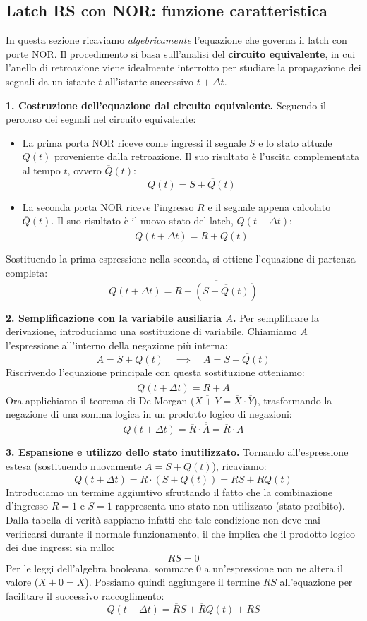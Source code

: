 \documentclass[11pt,a4paper]{report}
\begin{document}
\subsection{Latch RS con NOR: funzione caratteristica}

\noindent In questa sezione ricaviamo \emph{algebricamente} l'equazione che governa il latch con porte NOR.
Il procedimento si basa sull'analisi del \textbf{circuito equivalente}, in cui l'anello di retroazione viene idealmente interrotto per studiare la propagazione dei segnali da un istante $t$ all'istante successivo $t+\Delta t$.

\medskip
\noindent\textbf{1. Costruzione dell'equazione dal circuito equivalente.}
Seguendo il percorso dei segnali nel circuito equivalente:
\begin{itemize}[leftmargin=1.5em]
    \item La prima porta NOR riceve come ingressi il segnale $S$ e lo stato attuale $Q(t)$ proveniente dalla retroazione. Il suo risultato è l'uscita complementata al tempo $t$, ovvero $\overline{Q}(t)$:
    \[ \overline{Q}(t) = \overline{S + Q(t)} \]
    \item La seconda porta NOR riceve l'ingresso $R$ e il segnale appena calcolato $\overline{Q}(t)$. Il suo risultato è il nuovo stato del latch, $Q(t+\Delta t)$:
    \[ Q(t+\Delta t) = \overline{ R + \overline{Q}(t) } \]
\end{itemize}
Sostituendo la prima espressione nella seconda, si ottiene l'equazione di partenza completa:
\[
Q(t+\Delta t) = \overline{ R + (\overline{S + Q(t)}) }
\]

\medskip
\noindent\textbf{2. Semplificazione con la variabile ausiliaria $A$.}
Per semplificare la derivazione, introduciamo una sostituzione di variabile. Chiamiamo $A$ l'espressione all'interno della negazione più interna:
\[
A = S + Q(t) \quad \implies \quad \overline{A} = \overline{S + Q(t)}
\]
Riscrivendo l'equazione principale con questa sostituzione otteniamo:
\[
Q(t+\Delta t) = \overline{ R + \overline{A} }
\]
Ora applichiamo il teorema di De Morgan ($\overline{X + Y} = \overline{X} \cdot \overline{Y}$), trasformando la negazione di una somma logica in un prodotto logico di negazioni:
\[
Q(t+\Delta t) = \overline{R} \cdot \overline{\overline{A}} = \overline{R} \cdot A
\]

\medskip
\noindent\textbf{3. Espansione e utilizzo dello stato inutilizzato.}
Tornando all'espressione estesa (sostituendo nuovamente $A = S + Q(t)$), ricaviamo:
\[
Q(t+\Delta t) = \overline{R} \cdot (S + Q(t)) = \overline{R}S + \overline{R}Q(t)
\]
Introduciamo un termine aggiuntivo sfruttando il fatto che la combinazione d'ingresso $R=1$ e $S=1$ rappresenta uno stato non utilizzato (stato proibito).
Dalla tabella di verità sappiamo infatti che tale condizione non deve mai verificarsi durante il normale funzionamento, il che implica che il prodotto logico dei due ingressi sia nullo:
\[
RS = 0
\]
Per le leggi dell'algebra booleana, sommare $0$ a un'espressione non ne altera il valore ($X+0=X$). Possiamo quindi aggiungere il termine $RS$ all'equazione per facilitare il successivo raccoglimento:
\[
Q(t+\Delta t) = \overline{R}S + \overline{R}Q(t) + RS
\]
\end{document}
